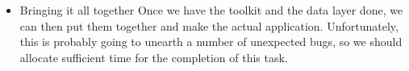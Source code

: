 \documentclass[titlepage,a4paper]{article}
\begin{document}
\begin{itemize}
\item Bringing it all together
Once we have the toolkit and the data layer done, we can then put them
together and make the actual application. Unfortunately, this is
probably going to unearth a number of unexpected bugs, so we should
allocate sufficient time for the completion of this task.

\end{itemize}
\end{document}
